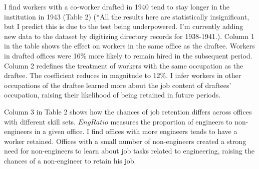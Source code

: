 \item I find workers with a co-worker drafted in 1940 tend to stay longer in the institution in 1943 (Table 2) (*All the results here are statistically insignificant, but I predict this is due to the test being underpowered. I'm currently adding new data to the dataset by digitizing directory records for 1938-1941.). Column 1 in the table shows the effect on workers in the same office as the draftee. Workers in drafted offices were 16\% more likely to remain hired in the subsequent period. Column 2 redefines the treatment of workers with the same occupation as the draftee. The coefficient reduces in magnitude to 12\%. I infer workers in other occupations of the draftee learned more about the job content of draftees' occupation, raising their likelihood of being retained in future periods.

Column 3 in Table 2 shows how the chances of job retention differs across offices with different skill sets. $EngRatio$ measures the proportion of engineers to non-engineers in a given office. I find offices with more engineers tends to have a worker retained. Offices with a small number of non-engineers created a strong need for non-engineers to learn about job tasks related to engineering, raising the chances of a non-engineer to retain his job.
